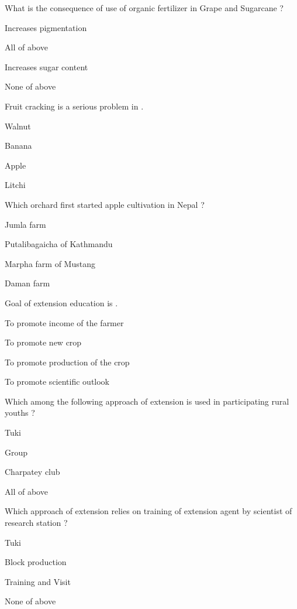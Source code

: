 \begin{questions}
\question What is the consequence of use of organic fertilizer in Grape and Sugarcane ?
\begin{items}
\item Increases pigmentation
\item All of above
\item* Increases sugar content
\item None of above
\end{items}

\question Fruit cracking is a serious problem in \fillin[][3cm].
\begin{items}
\item Walnut
\item Banana
\item Apple
\item* Litchi
\end{items}

\question Which orchard first started apple cultivation in Nepal ?
\begin{items}
\item Jumla farm
\item* Putalibagaicha of Kathmandu
\item Marpha farm of Mustang
\item Daman farm
\end{items}

\question Goal of extension education is \fillin[][3cm].
\begin{items}
\item To promote income of the farmer
\item To promote new crop
\item To promote production of the crop
\item* To promote scientific outlook
\end{items}

\question Which among the following approach of extension is used in participating rural youths ?
\begin{items}
\item Tuki
\item Group
\item* Charpatey club
\item All of above
\end{items}

\question Which approach of extension relies on training of extension agent by scientist of research station ?
\begin{items}
\item Tuki
\item Block production
\item* Training and Visit
\item None of above
\end{items}


\end{questions}
